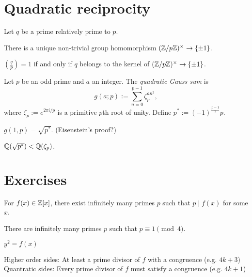 \documentclass{../../large}
\begin{document}
\section{Quadratic reciprocity}

\begin{prb}
Let $q$ be a prime relatively prime to $p$.
\begin{parts}
\item There is a unique non-trivial group homomorphism $(\mathbb{Z}/p\mathbb{Z})^\times\to\{\pm1\}$.
\item $\left(\frac qp\right)=1$ if and only if $q$ belongs to the kernel of $(\mathbb{Z}/p\mathbb{Z})^\times\to\{\pm1\}$.
\end{parts}

\end{prb}

\begin{prb}
Let $p$ be an odd prime and $a$ an integer.
The \emph{quadratic Gauss sum} is
\[g(a;p):=\sum_{n=0}^{p-1}\zeta_p^{an^2},\]
where $\zeta_p:=e^{2\pi i/p}$ is a primitive $p$th root of unity.
Define $p^*:=(-1)^{\frac{p-1}2}p$.
\begin{parts}
\item $g(1,p)=\sqrt{p^*}$. (Eisenstein's proof?)
\item $\mathbb{Q}(\sqrt{p^*})<\mathbb{Q}(\zeta_p)$.
\end{parts}
\end{prb}


\begin{prb}
\begin{parts}
\item 
\end{parts}
\end{prb}



\section*{Exercises}
\begin{prb}
\begin{parts}
\item For $f(x)\in\mathbb{Z}[x]$, there exist infinitely many primes $p$ such that $p\mid f(x)$ for some $x$.
\item There are infinitely many primes $p$ such that $p\equiv1\pmod4$.
\end{parts}
\end{prb}

\begin{prb}
$y^2=f(x)$

Higher order sides: At least a prime divisor of $f$ with a congruence (e.g. $4k+3$)
Quantratic sides: Every prime divisor of $f$ must satisfy a congruence (e.g. $4k+1$)
\end{prb}
\end{document}
